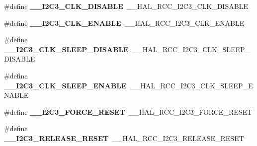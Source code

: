 \begin{DoxyCompactItemize}
\item 
\hypertarget{group___h_a_l___r_c_c___aliased_ga7da00da30c1b02d1c1299dd878214db2}{\#define {\bfseries \-\_\-\-\_\-\-I2\-C3\-\_\-\-C\-L\-K\-\_\-\-D\-I\-S\-A\-B\-L\-E}~\-\_\-\-\_\-\-H\-A\-L\-\_\-\-R\-C\-C\-\_\-\-I2\-C3\-\_\-\-C\-L\-K\-\_\-\-D\-I\-S\-A\-B\-L\-E}\label{group___h_a_l___r_c_c___aliased_ga7da00da30c1b02d1c1299dd878214db2}

\item 
\hypertarget{group___h_a_l___r_c_c___aliased_gaf7f71023839a5cad83bada95ff73741f}{\#define {\bfseries \-\_\-\-\_\-\-I2\-C3\-\_\-\-C\-L\-K\-\_\-\-E\-N\-A\-B\-L\-E}~\-\_\-\-\_\-\-H\-A\-L\-\_\-\-R\-C\-C\-\_\-\-I2\-C3\-\_\-\-C\-L\-K\-\_\-\-E\-N\-A\-B\-L\-E}\label{group___h_a_l___r_c_c___aliased_gaf7f71023839a5cad83bada95ff73741f}

\item 
\hypertarget{group___h_a_l___r_c_c___aliased_ga35accdf6700c08b879d2540130cf19aa}{\#define {\bfseries \-\_\-\-\_\-\-I2\-C3\-\_\-\-C\-L\-K\-\_\-\-S\-L\-E\-E\-P\-\_\-\-D\-I\-S\-A\-B\-L\-E}~\-\_\-\-\_\-\-H\-A\-L\-\_\-\-R\-C\-C\-\_\-\-I2\-C3\-\_\-\-C\-L\-K\-\_\-\-S\-L\-E\-E\-P\-\_\-\-D\-I\-S\-A\-B\-L\-E}\label{group___h_a_l___r_c_c___aliased_ga35accdf6700c08b879d2540130cf19aa}

\item 
\hypertarget{group___h_a_l___r_c_c___aliased_gabd22a89f4561c5988d6553525c4f2ace}{\#define {\bfseries \-\_\-\-\_\-\-I2\-C3\-\_\-\-C\-L\-K\-\_\-\-S\-L\-E\-E\-P\-\_\-\-E\-N\-A\-B\-L\-E}~\-\_\-\-\_\-\-H\-A\-L\-\_\-\-R\-C\-C\-\_\-\-I2\-C3\-\_\-\-C\-L\-K\-\_\-\-S\-L\-E\-E\-P\-\_\-\-E\-N\-A\-B\-L\-E}\label{group___h_a_l___r_c_c___aliased_gabd22a89f4561c5988d6553525c4f2ace}

\item 
\hypertarget{group___h_a_l___r_c_c___aliased_ga82bddd15cceee64406a35ffc4f31591f}{\#define {\bfseries \-\_\-\-\_\-\-I2\-C3\-\_\-\-F\-O\-R\-C\-E\-\_\-\-R\-E\-S\-E\-T}~\-\_\-\-\_\-\-H\-A\-L\-\_\-\-R\-C\-C\-\_\-\-I2\-C3\-\_\-\-F\-O\-R\-C\-E\-\_\-\-R\-E\-S\-E\-T}\label{group___h_a_l___r_c_c___aliased_ga82bddd15cceee64406a35ffc4f31591f}

\item 
\hypertarget{group___h_a_l___r_c_c___aliased_gad171d101f4540442a523779af94780a7}{\#define {\bfseries \-\_\-\-\_\-\-I2\-C3\-\_\-\-R\-E\-L\-E\-A\-S\-E\-\_\-\-R\-E\-S\-E\-T}~\-\_\-\-\_\-\-H\-A\-L\-\_\-\-R\-C\-C\-\_\-\-I2\-C3\-\_\-\-R\-E\-L\-E\-A\-S\-E\-\_\-\-R\-E\-S\-E\-T}\label{group___h_a_l___r_c_c___aliased_gad171d101f4540442a523779af94780a7}


\end{DoxyCompactItemize}

